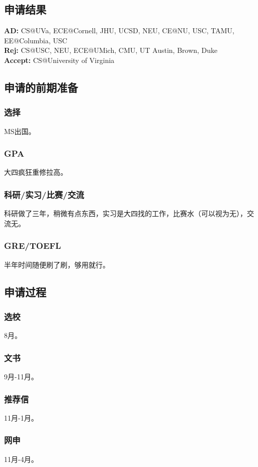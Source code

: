 \documentclass[a4paper,UTF8]{book}
\begin{document}
    \subsection*{申请结果}
        \textbf{AD:} CS@UVa, ECE@Cornell, JHU, UCSD, NEU, CE@NU, USC, TAMU, EE@Columbia, USC\\
        \textbf{Rej:} CS@USC, NEU, ECE@UMich, CMU, UT Austin, Brown, Duke\\
        \textbf{Accept:} CS@University of Virginia

    \subsection*{申请的前期准备}
        \subsubsection*{选择}
        MS出国。
        \subsubsection*{GPA}
        大四疯狂重修拉高。
        \subsubsection*{科研/实习/比赛/交流}
        科研做了三年，稍微有点东西，实习是大四找的工作，比赛水（可以视为无），交流无。
        \subsubsection*{GRE/TOEFL}
        半年时间随便刷了刷，够用就行。

    \subsection*{申请过程}
        \subsubsection*{选校}
        8月。
        \subsubsection*{文书}
        9月-11月。
        \subsubsection*{推荐信}
        11月-1月。
        \subsubsection*{网申}
        11月-4月。
\end{document}
